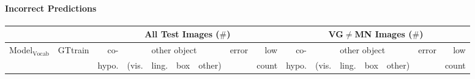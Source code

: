 \paragraph{Incorrect Predictions}

\begin{table}[t]
	\centering
	\small
	\begin{tabular}{l|c|r@{~}|r@{~}r@{~}r@{~}r@{~}|r@{~}r@{~}||r@{~}|r@{~}r@{~}r@{~}r@{~}|r@{~}r@{~}}
		\toprule
		&& \multicolumn{7}{c}{All Test Images ($\#$)} 
		& \multicolumn{7}{c}{VG$\neq$MN Images ($\#$)}\\
		\toprule
		Model$_{\text{Vocab}}$ & GTtrain  
		&  co- &  \multicolumn{4}{c}{other object}  &  error &  low 
		&  co- &  \multicolumn{4}{c}{other object}  &  error &  low \\
		& & hypo. & (vis. &  ling. &  box &  other)   & & count 
		&  hypo. & (vis. &  ling. &  box &  other) &   & count     \\
		

\end{tabular}
\end{table}
